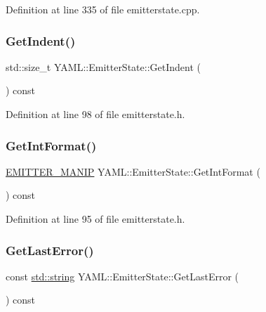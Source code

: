 Definition at line 335 of file emitterstate.\+cpp.

\mbox{\label{class_y_a_m_l_1_1_emitter_state_a7a4866479b0e6e1fcc58de790fee61cf}} 
\subsubsection{\texorpdfstring{GetIndent()}{GetIndent()}}
{\footnotesize\ttfamily std\+::size\+\_\+t Y\+A\+M\+L\+::\+Emitter\+State\+::\+Get\+Indent (\begin{DoxyParamCaption}{ }\end{DoxyParamCaption}) const\hspace{0.3cm}{\ttfamily [inline]}}



Definition at line 98 of file emitterstate.\+h.

\mbox{\label{class_y_a_m_l_1_1_emitter_state_a13a301c5d3a3799de2d98d0ca2d356a5}} 
\subsubsection{\texorpdfstring{GetIntFormat()}{GetIntFormat()}}
{\footnotesize\ttfamily \mbox{\hyperlink{namespace_y_a_m_l_a67c320aa50d3de7ecba1d0b8775dd684}{E\+M\+I\+T\+T\+E\+R\+\_\+\+M\+A\+N\+IP}} Y\+A\+M\+L\+::\+Emitter\+State\+::\+Get\+Int\+Format (\begin{DoxyParamCaption}{ }\end{DoxyParamCaption}) const\hspace{0.3cm}{\ttfamily [inline]}}



Definition at line 95 of file emitterstate.\+h.

\mbox{\label{class_y_a_m_l_1_1_emitter_state_a293a4e03db90d77554006dba84d05ab4}} 
\subsubsection{\texorpdfstring{GetLastError()}{GetLastError()}}
{\footnotesize\ttfamily const \mbox{\hyperlink{glad_8h_ac83513893df92266f79a515488701770}{std\+::string}} Y\+A\+M\+L\+::\+Emitter\+State\+::\+Get\+Last\+Error (\begin{DoxyParamCaption}{ }\end{DoxyParamCaption}) const\hspace{0.3cm}{\ttfamily [inline]}}



